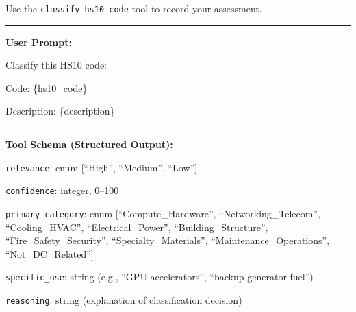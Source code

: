 \documentclass[12pt,pdftex]{article}
\newenvironment{prompt}{\par\medskip\noindent}{\par\medskip}
\begin{document}
\begin{onehalfspacing}
\begin{prompt}
\medskip

Use the \texttt{classify\_hs10\_code} tool to record your assessment.

\bigskip
\hrule
\bigskip

\textbf{User Prompt:}

\medskip

Classify this HS10 code:

Code: \{hs10\_code\}

Description: \{description\}

\bigskip
\hrule
\bigskip

\textbf{Tool Schema (Structured Output):}

\medskip

\texttt{relevance}: enum [``High'', ``Medium'', ``Low'']

\texttt{confidence}: integer, 0--100

\texttt{primary\_category}: enum [``Compute\_Hardware'', ``Networking\_Telecom'', ``Cooling\_HVAC'', ``Electrical\_Power'', ``Building\_Structure'', ``Fire\_Safety\_Security'', ``Specialty\_Materials'', ``Maintenance\_Operations'', ``Not\_DC\_Related'']

\texttt{specific\_use}: string (e.g., ``GPU accelerators'', ``backup generator fuel'')

\texttt{reasoning}: string (explanation of classification decision)

\end{prompt}


\end{onehalfspacing}
\end{document}
